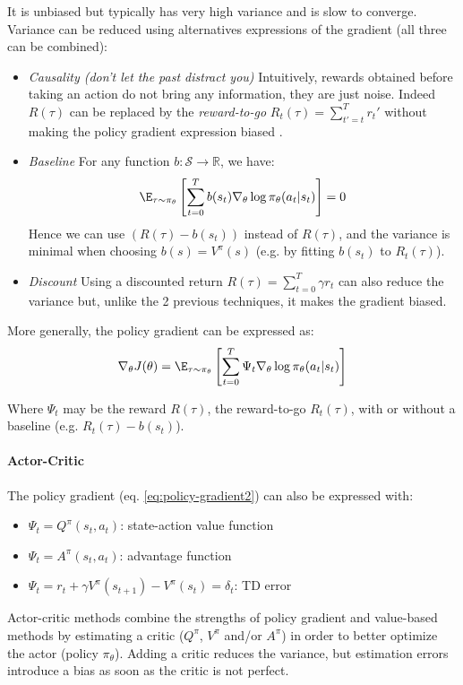 It is unbiased but typically has very high variance and is slow to converge. Variance can be reduced using alternatives expressions of the gradient (all three can be combined):
\begin{itemize}
    \item \emph{Causality (don't let the past distract you)}
    Intuitively, rewards obtained before taking an action do not bring any information, they are just noise. Indeed $R(\tau)$ can be replaced by the \emph{reward-to-go} $R_t(\tau) = \sum_{t'=t}^T r_t'$ without making the policy gradient expression biased \demo.
    \item \emph{Baseline}
    For any function $b:\mathcal{S} \rightarrow \mathbb{R}$, we have:
    \[
        \E_{\tau \sim \pi_\theta} \left[\sum_{t=0}^T b(s_t) \nabla_\theta \log \pi_\theta(a_t | s_t) \right] = 0
    \]
    Hence \demo we can use $(R(\tau) - b(s_t))$ instead of $R(\tau)$, and the variance is minimal when choosing $b(s) = V^\pi(s)$  (e.g. by fitting $b(s_t)$ to  $R_t(\tau)$).
    \item \emph{Discount}
    Using a discounted return $R(\tau) = \sum_{t=0}^T \gamma r_t$ can also reduce the variance but, unlike the 2 previous techniques, it makes the gradient biased. 
\end{itemize}

More generally, the policy gradient can be expressed as:
\begin{equation}
    \nabla_\theta J(\theta) 
    = \E_{\tau \sim \pi_\theta} \left[\sum_{t=0}^T \Psi_t \nabla_\theta \log \pi_\theta(a_t | s_t) \right]
    \label{eq:policy-gradient2}
\end{equation}

Where $\Psi_t$ may be the reward $R(\tau)$, the reward-to-go $R_t(\tau)$, with or without a baseline (e.g. $R_t(\tau) - b(s_t)$).

\paragraph{Actor-Critic}
The policy gradient (eq. \ref{eq:policy-gradient2}) can also be expressed \demo with:
\begin{itemize}
    \item $\Psi_t = Q^\pi(s_t,a_t)$: state-action value function
    \item $\Psi_t = A^\pi(s_t,a_t)$: advantage function
    \item $\Psi_t = r_t + \gamma V^\pi(s_{t+1}) - V^\pi(s_t) = \delta_t$: TD error
\end{itemize}
Actor-critic methods combine the strengths of policy gradient and value-based methods by estimating a critic ($Q^\pi$, $V^\pi$ and/or $A^\pi$) in order to better optimize the actor (policy $\pi_\theta$). Adding a critic reduces the variance, but estimation errors introduce a bias as soon as the critic is not perfect.

